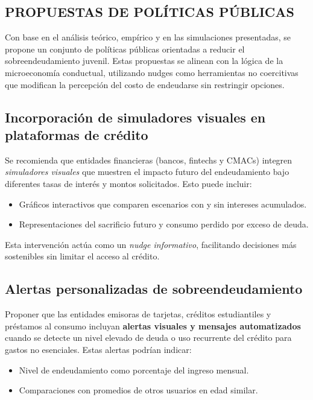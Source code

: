 \documentclass[10pt]{article}
\begin{document}
\begin{multicols}{2}
\section{PROPUESTAS DE POLÍTICAS PÚBLICAS}

Con base en el análisis teórico, empírico y en las simulaciones presentadas, se propone un conjunto de políticas públicas orientadas a reducir el sobreendeudamiento juvenil. Estas propuestas se alinean con la lógica de la microeconomía conductual, utilizando nudges como herramientas no coercitivas que modifican la percepción del costo de endeudarse sin restringir opciones.

\vspace{0.5em}

\subsection{Incorporación de simuladores visuales en plataformas de crédito}

Se recomienda que entidades financieras (bancos, fintechs y CMACs) integren \textit{simuladores visuales} que muestren el impacto futuro del endeudamiento bajo diferentes tasas de interés y montos solicitados. Esto puede incluir:
\begin{itemize}
    \item Gráficos interactivos que comparen escenarios con y sin intereses acumulados.
    \item Representaciones del sacrificio futuro y consumo perdido por exceso de deuda.
\end{itemize}

Esta intervención actúa como un \textit{nudge informativo}, facilitando decisiones más sostenibles sin limitar el acceso al crédito.

\vspace{0.5em}

\subsection{Alertas personalizadas de sobreendeudamiento}

Proponer que las entidades emisoras de tarjetas, créditos estudiantiles y préstamos al consumo incluyan \textbf{alertas visuales y mensajes automatizados} cuando se detecte un nivel elevado de deuda o uso recurrente del crédito para gastos no esenciales. Estas alertas podrían indicar:
\begin{itemize}
    \item Nivel de endeudamiento como porcentaje del ingreso mensual.
    \item Comparaciones con promedios de otros usuarios en edad similar.
\end{itemize}


\end{multicols}
\end{document}
